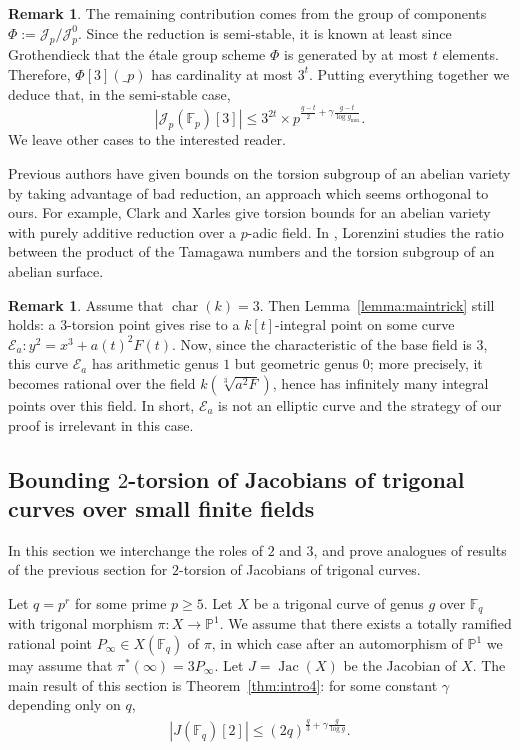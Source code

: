 \documentclass[11pt]{article}
\newcommand{\F}{\ensuremath{\mathbb{F}}}
\theoremstyle{plain}
\theoremstyle{definition}
\newtheorem{remark}[theorem]{Remark}
\DeclareMathOperator{\Jac}{Jac}
\DeclareMathOperator{\car}{char}
\begin{document}
\begin{remark}
The remaining contribution comes from the group of components $\Phi:=\mathcal{J}_p/\mathcal{J}_p^0$. Since the reduction is semi-stable, it is known at least since Grothendieck \cite[expos\'e~IX, 11.9, 11.11]{SGA7-1} that the {\'e}tale group scheme $\Phi$ is generated by at most $t$ elements. Therefore, $\Phi[3](\_p)$ has cardinality at most $3^t$. Putting everything together we deduce that, in the semi-stable case,
$$
|\mathcal{J}_p(\F_p)[3]| \leq 3^{2t}\times p^{\frac{g-t}{2}+\gamma\frac{g-t}{\log g_{\min}}}.
$$
We leave other cases to the interested reader.
\end{remark}


Previous authors have given bounds on the torsion subgroup of an abelian variety by taking advantage of bad reduction, an approach which seems orthogonal to ours. For example, Clark and Xarles \cite{CX2008} give torsion bounds for an abelian variety with purely additive reduction over a $p$-adic field. In \cite{Lorenzini2011}, Lorenzini studies the ratio between the product of the Tamagawa numbers and the torsion subgroup of an abelian surface.


\begin{remark}
\label{remark:char3}
Assume that $\car(k)=3$. Then Lemma~\ref{lemma:maintrick} still holds: a $3$-torsion point gives rise to a $k[t]$-integral point on some curve $\mathcal{E}_a:y^2=x^3+a(t)^2F(t)$. Now, since the characteristic of the base field is $3$, this curve $\mathcal{E}_a$ has arithmetic genus $1$ but geometric genus $0$; more precisely, it becomes rational over the field $k(\sqrt[3]{a^2F})$, hence has infinitely many integral points over this field. In short, $\mathcal{E}_a$ is not an elliptic curve and the strategy of our proof is irrelevant in this case.
\end{remark}


\subsection{Bounding $2$-torsion of Jacobians of trigonal curves over small finite fields}
\label{section5}

In this section we interchange the roles of $2$ and $3$, and prove analogues of results of the previous section for $2$-torsion of Jacobians of trigonal curves.


Let $q=p^r$ for some prime $p\geq 5$.
Let $X$ be a trigonal curve of genus $g$ over $\mathbb{F}_q$ with trigonal morphism $\pi:X\to\mathbb{P}^1$. We assume that there exists a totally ramified rational point $P_\infty\in X(\mathbb{F}_q)$ of $\pi$, in which case after an automorphism of $\mathbb{P}^1$ we may assume that $\pi^*(\infty)=3P_\infty$. Let $J=\Jac(X)$ be the Jacobian of $X$.
The main result of this section is Theorem~\ref{thm:intro4}: for some constant $\gamma$ depending only on $q$,
\begin{align*}
|J(\mathbb{F}_q)[2]|\leq (2q)^{\frac{g}{3}+\gamma\frac{g}{\log g}}.
\end{align*}
\end{document}
